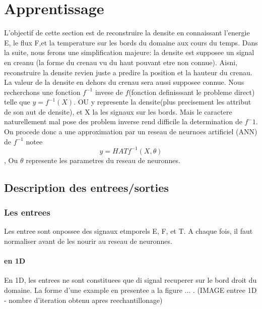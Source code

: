 
\chapter{Apprentissage} %

\label{Chapter4} %

L'objectif de cette section est de reconstruire la densite en connaissant l'energie E, le flux F,et la temperature sur les bords du domaine aux cours du temps. Dans la suite, nous ferons une simplification majeure: la densite est supposee un signal en creanu (la forme du crenau vu du haut pouvant etre non connue). Aisni, reconstruire la densite revien juste a predire la position et la hauteur du crenau. La valeur de la densite en dehors du crenau sera aussi supposee connue. Nous recherchons une fonction $f^{-1}$ invese de $f$(fonction definisssant le probleme direct) telle que $y = f^{-1}(X)$. OU y represente la densite(plus precisement les attribut de son aut de densite), et X la les signaux sur les bords. Mais le caractere naturellement mal pose des problem inverse rend difficile la determination de $f^-1$. On procede donc a une approximation par un reseau de neurnoes artificiel (ANN) de $f^{-1}$ notee $$y = HATf^{-1}(X, \theta)$$, Ou $\theta$ represente les parametres du reseau de neuronnes.


\section{Description des entrees/sorties}

\subsection{Les entrees}
Les entree sont onpossee des signaux etmporels E, F, et T. A chaque fois, il faut normaliser avant de les nourir au reseau de neuronnes. 

\subsubsection{en 1D}
En 1D, les entrees ne sont constituees que di signal recuperer sur le bord droit du domaine. La forme d'une example en presentee a la figure ... .
(IMAGE entree 1D - nombre d'iteration obtenu apres reechantillonage)

